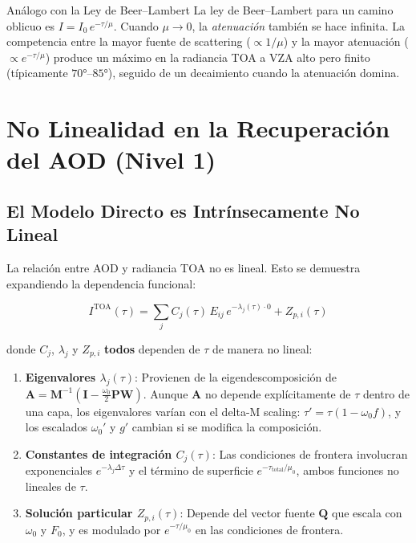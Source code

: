 \documentclass[a4paper,11pt]{article}
\begin{document}
\begin{physics}{An\'alogo con la Ley de Beer--Lambert}
La ley de Beer--Lambert para un camino oblicuo es
$I = I_0\,e^{-\tau/\mu}$.  Cuando $\mu \to 0$, la \emph{atenuaci\'on}
tambi\'en se hace infinita.  La competencia entre la mayor fuente de scattering
($\propto 1/\mu$) y la mayor atenuaci\'on ($\propto e^{-\tau/\mu}$) produce un
m\'aximo en la radiancia TOA a VZA alto pero finito (t\'ipicamente $70°$--$85°$),
seguido de un decaimiento cuando la atenuaci\'on domina.
\end{physics}


\section{No Linealidad en la Recuperaci\'on del AOD (Nivel 1)}
\label{sec:interp_nonlinear}

\subsection{El Modelo Directo es Intr\'insecamente No Lineal}

La relaci\'on entre AOD y radiancia TOA no es lineal. Esto se demuestra
expandiendo la dependencia funcional:

\begin{equation}
    I^{\text{TOA}}(\tau) = \sum_j C_j(\tau)\,E_{ij}\,e^{-\lambda_j(\tau)\cdot 0}
    + Z_{p,i}(\tau)
\end{equation}

donde $C_j$, $\lambda_j$ y $Z_{p,i}$ \textbf{todos} dependen de $\tau$ de
manera no lineal:

\begin{enumerate}
    \item \textbf{Eigenvalores $\lambda_j(\tau)$}: Provienen de la
          eigendescomposici\'on de $\mathbf{A} = \mathbf{M}^{-1}(\mathbf{I} -
          \frac{\omega_0}{2}\mathbf{P}\mathbf{W})$.  Aunque $\mathbf{A}$ no
          depende expl\'icitamente de $\tau$ dentro de una capa, los eigenvalores
          var\'ian con el delta-M scaling: $\tau' = \tau(1 - \omega_0 f)$, y los
          escalados $\omega_0'$ y $g'$ cambian si se modifica la composici\'on.

    \item \textbf{Constantes de integraci\'on $C_j(\tau)$}: Las condiciones de
          frontera involucran exponenciales $e^{-\lambda_j\Delta\tau}$ y el
          t\'ermino de superficie $e^{-\tau_{\text{total}}/\mu_0}$, ambos
          funciones no lineales de $\tau$.

    \item \textbf{Soluci\'on particular $Z_{p,i}(\tau)$}: Depende del vector
          fuente $\mathbf{Q}$ que escala con $\omega_0$ y $F_0$, y es
          modulado por $e^{-\tau/\mu_0}$ en las condiciones de frontera.
\end{enumerate}
\end{document}
